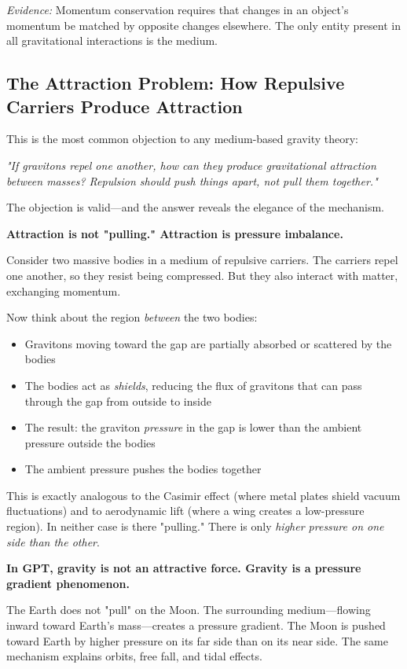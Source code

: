 \documentclass[12pt, a4paper]{article}
\begin{document}
\textit{Evidence:} Momentum conservation requires that changes in an object's momentum be matched by opposite changes elsewhere. The only entity present in all gravitational interactions is the medium.

\subsection{The Attraction Problem: How Repulsive Carriers Produce Attraction}
\label{subsec:attraction_problem}

This is the most common objection to any medium-based gravity theory:

\textit{"If gravitons repel one another, how can they produce gravitational attraction between masses? Repulsion should push things apart, not pull them together."}

The objection is valid—and the answer reveals the elegance of the mechanism.

\textbf{Attraction is not "pulling." Attraction is pressure imbalance.}

Consider two massive bodies in a medium of repulsive carriers. The carriers repel one another, so they resist being compressed. But they also interact with matter, exchanging momentum.

Now think about the region \textit{between} the two bodies:

\begin{itemize}
    \item Gravitons moving toward the gap are partially absorbed or scattered by the bodies
    \item The bodies act as \textit{shields}, reducing the flux of gravitons that can pass through the gap from outside to inside
    \item The result: the graviton \textit{pressure} in the gap is lower than the ambient pressure outside the bodies
    \item The ambient pressure pushes the bodies together
\end{itemize}

This is exactly analogous to the Casimir effect (where metal plates shield vacuum fluctuations) and to aerodynamic lift (where a wing creates a low-pressure region). In neither case is there "pulling." There is only \textit{higher pressure on one side than the other}.

\textbf{In GPT, gravity is not an attractive force. Gravity is a pressure gradient phenomenon.}

The Earth does not "pull" on the Moon. The surrounding medium—flowing inward toward Earth's mass—creates a pressure gradient. The Moon is pushed toward Earth by higher pressure on its far side than on its near side. The same mechanism explains orbits, free fall, and tidal effects.
\end{document}
